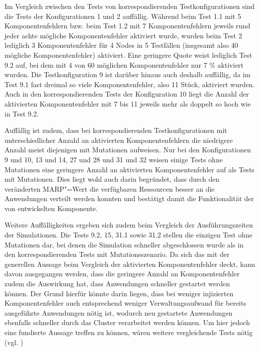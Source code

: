 Im Vergleich zwischen den Tests von korrespondierenden Testkonfigurationen sind die Tests der Konfigurationen 1 und 2 auffällig.
Während beim Test 1.1 mit 5 Komponentenfehlern bzw. beim Test 1.2 mit 7 Komponentenfehlern jeweils rund jeder achte mögliche Komponentenfehler aktiviert wurde, wurden beim Test 2 lediglich 3 Komponentenfehler für 4 Nodes in 5 Testfällen (insgesamt also 40 mögliche Komponentenfehler) aktiviert.
Eine geringere Quote weist lediglich Test 9.2 auf, bei dem mit 4 von 60 möglichen Komponentenfehler nur 7 \% aktiviert wurden.
Die Testkonfiguration 9 ist darüber hinaus auch deshalb auffällig, da im Test 9.1 fast dreimal so viele Komponentenfehler, also 11 Stück, aktiviert wurden.
Auch in den korrespondierenden Tests der Konfiguration 10 liegt die Anzahl der aktivierten Komponentenfehler mit 7 bis 11 jeweils mehr als doppelt so hoch wie in Test 9.2.

Auffällig ist zudem, dass bei korrespondierenden Testkonfigurationen mit unterschiedlicher Anzahl an aktivierten Komponentenfehlern die niedrigere Anzahl meist diejenigen mit Mutationen aufweisen.
Nur bei den Konfigurationen 9 und 10, 13 und 14, 27 und 28 und 31 und 32 weisen einige Tests ohne Mutationen eine geringere Anzahl an aktivierten Komponentenfehler auf als Tests mit Mutationen.
Dies liegt wohl auch darin begründet, dass durch den veränderten \ac{MARP}"=Wert die verfügbaren Ressourcen besser an die Anwendungen verteilt werden konnten und bestätigt damit die Funktionalität der von \citeauthor{Zhang2016} entwickelten Komponente.

Weitere Auffälligkeiten ergeben sich zudem beim Vergleich der Ausführungszeiten der Simulationen.
Die Tests 9.2, 15, 31.1 sowie 31.2 stellen die einzigen Test ohne Mutationen dar, bei denen die Simulation schneller abgeschlossen wurde als in den korrespondierenden Tests mit Mutationsszenario.
Da sich das mit der generellen Aussage beim Vergleich der aktivierten Komponentenfehler deckt, kann davon ausgegangen werden, dass die geringere Anzahl an Komponentenfehler zudem die Auswirkung hat, dass Anwendungen schneller gestartet werden können.
Der Grund hierfür könnte darin liegen, dass bei weniger injizierten Komponentenfehler auch entsprechend weniger Verwaltungsaufwand für bereits ausgeführte Anwendungen nötig ist, wodurch neu gestartete Anwendungen ebenfalls schneller durch das Cluster verarbeitet werden können.
Um hier jedoch eine fundierte Aussage treffen zu können, wären weitere vergleichende Tests nötig (vgl. )

